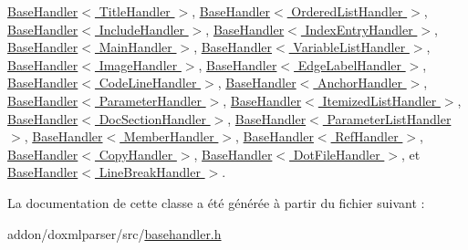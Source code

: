 \hyperlink{class_base_handler_ac94e086080a08af141e1db699fd45c12}{Base\+Handler$<$ Title\+Handler $>$}, \hyperlink{class_base_handler_ac94e086080a08af141e1db699fd45c12}{Base\+Handler$<$ Ordered\+List\+Handler $>$}, \hyperlink{class_base_handler_ac94e086080a08af141e1db699fd45c12}{Base\+Handler$<$ Include\+Handler $>$}, \hyperlink{class_base_handler_ac94e086080a08af141e1db699fd45c12}{Base\+Handler$<$ Index\+Entry\+Handler $>$}, \hyperlink{class_base_handler_ac94e086080a08af141e1db699fd45c12}{Base\+Handler$<$ Main\+Handler $>$}, \hyperlink{class_base_handler_ac94e086080a08af141e1db699fd45c12}{Base\+Handler$<$ Variable\+List\+Handler $>$}, \hyperlink{class_base_handler_ac94e086080a08af141e1db699fd45c12}{Base\+Handler$<$ Image\+Handler $>$}, \hyperlink{class_base_handler_ac94e086080a08af141e1db699fd45c12}{Base\+Handler$<$ Edge\+Label\+Handler $>$}, \hyperlink{class_base_handler_ac94e086080a08af141e1db699fd45c12}{Base\+Handler$<$ Code\+Line\+Handler $>$}, \hyperlink{class_base_handler_ac94e086080a08af141e1db699fd45c12}{Base\+Handler$<$ Anchor\+Handler $>$}, \hyperlink{class_base_handler_ac94e086080a08af141e1db699fd45c12}{Base\+Handler$<$ Parameter\+Handler $>$}, \hyperlink{class_base_handler_ac94e086080a08af141e1db699fd45c12}{Base\+Handler$<$ Itemized\+List\+Handler $>$}, \hyperlink{class_base_handler_ac94e086080a08af141e1db699fd45c12}{Base\+Handler$<$ Doc\+Section\+Handler $>$}, \hyperlink{class_base_handler_ac94e086080a08af141e1db699fd45c12}{Base\+Handler$<$ Parameter\+List\+Handler $>$}, \hyperlink{class_base_handler_ac94e086080a08af141e1db699fd45c12}{Base\+Handler$<$ Member\+Handler $>$}, \hyperlink{class_base_handler_ac94e086080a08af141e1db699fd45c12}{Base\+Handler$<$ Ref\+Handler $>$}, \hyperlink{class_base_handler_ac94e086080a08af141e1db699fd45c12}{Base\+Handler$<$ Copy\+Handler $>$}, \hyperlink{class_base_handler_ac94e086080a08af141e1db699fd45c12}{Base\+Handler$<$ Dot\+File\+Handler $>$}, et \hyperlink{class_base_handler_ac94e086080a08af141e1db699fd45c12}{Base\+Handler$<$ Line\+Break\+Handler $>$}.



La documentation de cette classe a été générée à partir du fichier suivant \+:\begin{DoxyCompactItemize}
\item 
addon/doxmlparser/src/\hyperlink{basehandler_8h}{basehandler.\+h}\end{DoxyCompactItemize}
